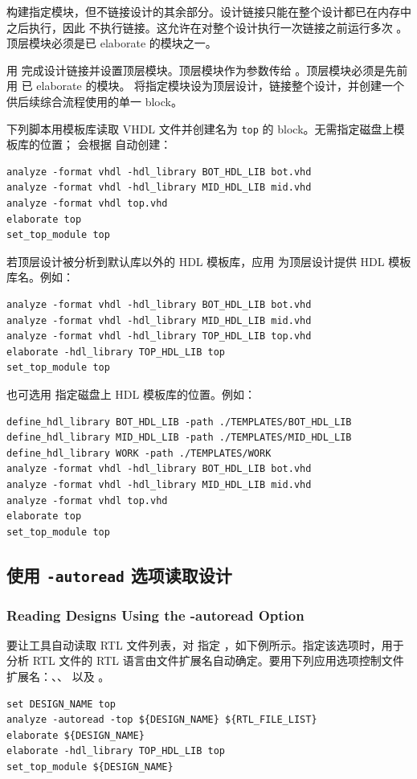  构建指定模块，但不链接设计的其余部分。设计链接只能在整个设计都已在内存中之后执行，因此  不执行链接。这允许在对整个设计执行一次链接之前运行多次 。顶层模块必须是已 elaborate 的模块之一。

用  完成设计链接并设置顶层模块。顶层模块作为参数传给 。顶层模块必须是先前用  已 elaborate 的模块。 将指定模块设为顶层设计，链接整个设计，并创建一个供后续综合流程使用的单一 block。

下列脚本用模板库读取 VHDL 文件并创建名为 \texttt{top} 的 block。无需指定磁盘上模板库的位置； 会根据  自动创建：
\begin{lstlisting}
analyze -format vhdl -hdl_library BOT_HDL_LIB bot.vhd
analyze -format vhdl -hdl_library MID_HDL_LIB mid.vhd
analyze -format vhdl top.vhd
elaborate top
set_top_module top
\end{lstlisting}

若顶层设计被分析到默认库以外的 HDL 模板库，应用  为顶层设计提供 HDL 模板库名。例如：
\begin{lstlisting}
analyze -format vhdl -hdl_library BOT_HDL_LIB bot.vhd
analyze -format vhdl -hdl_library MID_HDL_LIB mid.vhd
analyze -format vhdl -hdl_library TOP_HDL_LIB top.vhd
elaborate -hdl_library TOP_HDL_LIB top
set_top_module top
\end{lstlisting}

也可选用  指定磁盘上 HDL 模板库的位置。例如：
\begin{lstlisting}
define_hdl_library BOT_HDL_LIB -path ./TEMPLATES/BOT_HDL_LIB
define_hdl_library MID_HDL_LIB -path ./TEMPLATES/MID_HDL_LIB
define_hdl_library WORK -path ./TEMPLATES/WORK
analyze -format vhdl -hdl_library BOT_HDL_LIB bot.vhd
analyze -format vhdl -hdl_library MID_HDL_LIB mid.vhd
analyze -format vhdl top.vhd
elaborate top
set_top_module top
\end{lstlisting}

\subsection{使用 \texttt{-autoread} 选项读取设计}
\subsubsection*{Reading Designs Using the -autoread Option}

要让工具自动读取 RTL 文件列表，对  指定 ，如下例所示。指定该选项时，用于分析 RTL 文件的 RTL 语言由文件扩展名自动确定。要用下列应用选项控制文件扩展名：、、 以及 。
\begin{lstlisting}
set DESIGN_NAME top
analyze -autoread -top ${DESIGN_NAME} ${RTL_FILE_LIST}
elaborate ${DESIGN_NAME}
elaborate -hdl_library TOP_HDL_LIB top
set_top_module ${DESIGN_NAME}
\end{lstlisting}

